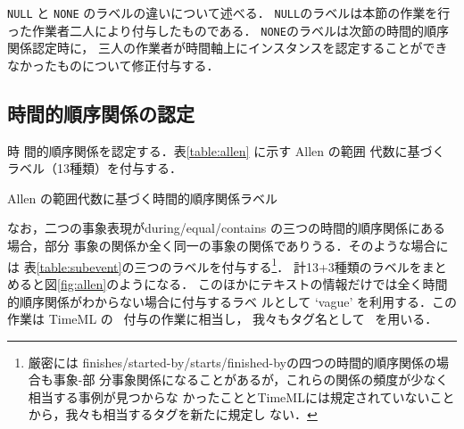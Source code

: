 \documentclass[japanese]{jnlp_1.4}
\newcommand{\modified}[1]{}
\def\timexiii{}
\def\tlink{}
\def\makeinstance{}
\begin{document}
\modified{以下，}{\tt NULL} と {\tt NONE} のラベルの違いについて述べる．
{\tt NULL}のラベルは本節の作業を行った作業者二人により付与したものである．
{\tt NONE}のラベルは次節の時間的順序関係認定時に，
三人の作業者が時間軸上にインスタンスを認定することができなかったものについて修正付与する．

\modified{事象構造そのもののアノテーションは意味論レベルの情報付与に相当し，言語
学的な知見から様々な記号化手法が考えられる．本研究は時間情報表現・事象表現間の時
間的順序関係の可視化を目的としており，そのアノテーション形式の標準化である
ISO-TimeML の枠組の範囲内で，値割り当てとしてのアノテーション基準を定めた．
本節のアノテーション作業にあたっては次の\ref{subsec:timerel}節で行う被験者実験的な時間的順序関係アノテーションの基底となる情報のために MAMA サイクルに基づき厳密な統制を行った．}


\subsection{時間的順序関係の認定}
\label{subsec:timerel}

\modified{本研究は時間構造に対する複数人の認識の差異を評価するために，被験者実験
的に時間的順序関係アノテーションを実施する．時間的順序関係について，事象が表現す
る時間構造が長さ0以上の時区間である（時点は長さ0の時区間として扱う）と
仮定をおく．このことにより個々人が認識する事象表現の時間構造を，人工知能分野でよ
く研究されている Allen の時区間論理\cite{allen-1983}として表現することができる．アノテーション作
業者は，時間軸上に二つの時区間をプロットすることで描画的に事象の時区間を表現す
ることができる．直感的であるために短時間の教示でアノテーションが可能になる．}

\modified{具体的には，先行研究で付与されている \timexiii\ タグ範囲の時間情報表現
と \makeinstance\ タグにより認定した事象表現のインスタンスに対して，\tlink\ 相当の}時
間的順序関係を認定する．表\ref{table:allen} に示す Allen の\modified{二次の}範囲
代数に基づくラベル（13種類）を付与する．\modified{採用するラベ
ル集合は，標準化されているアノテーション形式であるため，他の研究者が多言語で言語横断的に分析する際にも有効だと考える．}

\begin{table}[t]
\caption{Allen の範囲代数に基づく時間的順序関係ラベル}
\label{table:allen}

\end{table}

なお，二つの事象表現がduring/equal/contains の三つの時間的順序関係にある場合，部分
事象の関係か全く同一の事象の関係でありうる．そのような場合には
表\ref{table:subevent}の三つのラベルを付与する\footnote{厳密には
finishes/started-by/starts/finished-byの四つの時間的順序関係の場合も事象-部
分事象関係になることがあるが，これらの関係の頻度が少なく相当する事例が見つからな
かったこととTimeMLには規定されていないことから，我々も相当するタグを新たに規定し
ない．}．
計13+3種類のラベルをまとめると図\ref{fig:allen}のようになる．
このほかにテキストの情報だけでは全く時間的順序関係がわからない場合に付与するラベ
ルとして `vague' を利用する．この作業は TimeML の \tlink\ 付与の作業に相当し，
我々もタグ名として \tlink\ を用いる．
\end{document}
